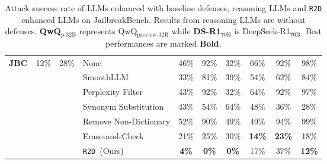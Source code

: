 \begin{table*}[t!]
{\begin{tabular}{ccc|lcccccc}
\midrule
\multirow{7}{*}{\textbf{JBC}} & \multirow{7}{*}{12\%} & \multirow{7}{*}{28\%} 
& \cellcolor{gray!30}None & \cellcolor{gray!30}46\% & \cellcolor{gray!30}92\% & \cellcolor{gray!30}32\% & \cellcolor{gray!30}66\% & \cellcolor{gray!30}92\% & \cellcolor{gray!30}98\% \\
&&& SmoothLLM & 33\% & 81\% & 39\% & 54\% & 62\% & 84\% \\  
&&& Perplexity Filter & 43\% & 92\% & 32\% & 64\% & 92\% & 97\% \\
&&& Synonym Substitution & 43\% & 54\% & 64\% & 48\% & 36\% & 28\% \\
&&& Remove Non-Dictionary & 52\% & 90\% & 49\% & 49\% & 94\% & 99\% \\
&&& Erase-and-Check & 21\% & 25\% & 30\% & \textbf{14\%} & \textbf{23\%} & 18\% \\
&&& \cellcolor{gray!50}\texttt{R2D}~(Ours) & \cellcolor{gray!50}\textbf{4\%} & \cellcolor{gray!50}\textbf{0\%} & \cellcolor{gray!50}\textbf{0\%} & \cellcolor{gray!50}17\% & \cellcolor{gray!50}37\% & \cellcolor{gray!50}\textbf{12\%} \\
\bottomrule
\end{tabular}
}
\caption{Attack success rate of LLMs enhanced with baseline defenses, reasoning LLMs and \texttt{R2D} enhanced LLMs on JailbreakBench. Results from reasoning LLMs are without defenses. \textbf{QwQ$_\text{p-32B}$} represents QwQ$_\text{preview-32B}$ while \textbf{DS-R1$_\text{70B}$} is DeepSeek-R1$_\text{70B}$. Best performances are marked \textbf{Bold}.}
\label{tab:jbb_results}
\end{table*}
